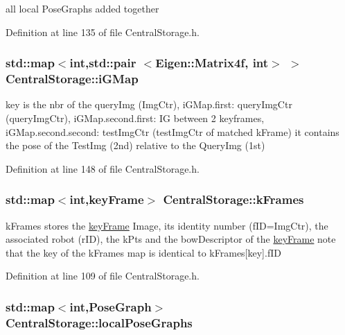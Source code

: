 all local \-Pose\-Graphs added together 



\-Definition at line 135 of file \-Central\-Storage.\-h.

\hypertarget{classCentralStorage_a3ae59bfa3849b3dd984c636e0a9af23a}{
\subsubsection[{i\-G\-Map}]{\setlength{\rightskip}{0pt plus 5cm}std\-::map$<$int,std\-::pair $<$\-Eigen\-::\-Matrix4f, int$>$ $>$ {\bf \-Central\-Storage\-::i\-G\-Map}}}\label{classCentralStorage_a3ae59bfa3849b3dd984c636e0a9af23a}
key is the nbr of the query\-Img (\-Img\-Ctr), i\-G\-Map.\-first\-: query\-Img\-Ctr (query\-Img\-Ctr), i\-G\-Map.\-second.\-first\-: \-I\-G between 2 keyframes, i\-G\-Map.\-second.\-second\-: test\-Img\-Ctr (test\-Img\-Ctr of matched k\-Frame) it contains the pose of the \-Test\-Img (2nd) relative to the \-Query\-Img (1st) 

\-Definition at line 148 of file \-Central\-Storage.\-h.

\hypertarget{classCentralStorage_ab477c78726c58cba1b5b14255700ff64}{
\subsubsection[{k\-Frames}]{\setlength{\rightskip}{0pt plus 5cm}std\-::map$<$int,{\bf key\-Frame}$>$ {\bf \-Central\-Storage\-::k\-Frames}}}\label{classCentralStorage_ab477c78726c58cba1b5b14255700ff64}
k\-Frames stores the \hyperlink{structkeyFrame}{key\-Frame} \-Image, its identity number (f\-I\-D=\-Img\-Ctr), the associated robot (r\-I\-D), the k\-Pts and the bow\-Descriptor of the \hyperlink{structkeyFrame}{key\-Frame} note that the key of the k\-Frames map is identical to k\-Frames\mbox{[}key\mbox{]}.f\-I\-D 

\-Definition at line 109 of file \-Central\-Storage.\-h.

\hypertarget{classCentralStorage_a872f54468c1ac5aa5438d3c820cfc5bd}{
\subsubsection[{local\-Pose\-Graphs}]{\setlength{\rightskip}{0pt plus 5cm}std\-::map$<$int,{\bf \-Pose\-Graph}$>$ {\bf \-Central\-Storage\-::local\-Pose\-Graphs}}}\label{classCentralStorage_a872f54468c1ac5aa5438d3c820cfc5bd}


